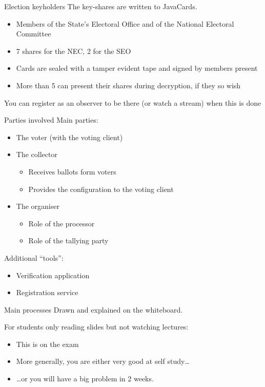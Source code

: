 \begin{frame}{Election keyholders}
  The key-shares are written to JavaCards.
  \begin{itemize}[<+(1)->]
    \item Members of the State's Electoral Office and of the National Electoral Committee
    \item 7 shares for the NEC, 2 for the SEO
    \item Cards are sealed with a tamper evident tape and signed by members present
    \item More than 5 can present their shares during decryption, if they so wish
  \end{itemize}

  \vspace*{1em}

  \pause
  You can register as an observer to be there (or watch a stream) when this is done
\end{frame}

\begin{frame}{Parties involved}
  Main parties:
  \begin{itemize}[<+(1)->]
    \item The voter (with the voting client)
    \item The collector
    \par
    \begin{itemize}
      \item Receives ballots form voters
      \item Provides the configuration to the voting client
    \end{itemize}
    \item The organiser
    \par
    \begin{itemize}
      \item Role of the processor
      \item Role of the tallying party
    \end{itemize}
  \end{itemize}

  \pause
  Additional \enquote{tools}:
  \begin{itemize}[<+(1)->]
    \item Verification application
    \item Registration service 
  \end{itemize}
\end{frame}

\begin{frame}{Main processes}
  Drawn and explained on the whiteboard.

  \vspace*{1em}

  \pause
  For students only reading slides but not watching lectures:
  \begin{itemize}[<+(1)->]
    \item This is on the exam
    \item More generally, you are either very good at self study\dots
    \item \dots{}or you will have a big problem in 2 weeks.
  \end{itemize}
\end{frame}

